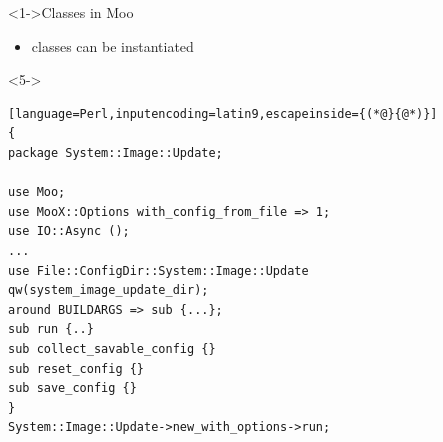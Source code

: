 \documentclass[ngerman,xcolor={table,dvipsnames},smaller,compress,hyperref={bookmarks,colorlinks}]{beamer}%
\begin{document}
\begin{frame}[t,fragile]

\begin{block}<1->{Classes in Moo}
\begin{itemize}
\item classes can be instantiated
\end{itemize}
\end{block}

\begin{block}<5->{}
\scriptsize
\begin{lstlisting}[language=Perl,inputencoding=latin9,escapeinside={(*@}{@*)}]
{
package System::Image::Update;

use Moo;
use MooX::Options with_config_from_file => 1;
use IO::Async ();
...
use File::ConfigDir::System::Image::Update qw(system_image_update_dir);
around BUILDARGS => sub {...};
sub run {..}
sub collect_savable_config {}
sub reset_config {}
sub save_config {}
}
System::Image::Update->new_with_options->run;
\end{lstlisting}
\end{block}

\end{frame}
\end{document}
